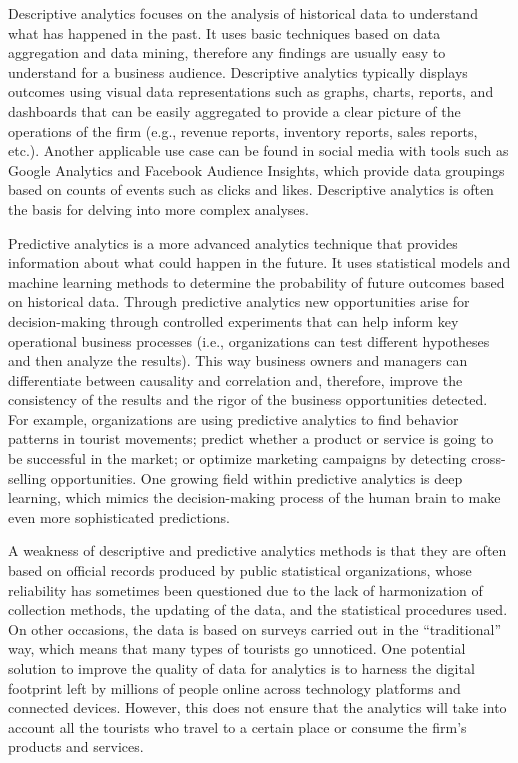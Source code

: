 \documentclass[
  letterpaper,
  DIV=11,
  numbers=noendperiod]{scrreprt}
\begin{document}
Descriptive analytics focuses on the analysis of historical data to
understand what has happened in the past. It uses basic techniques based
on data aggregation and data mining, therefore any findings are usually
easy to understand for a business audience. Descriptive analytics
typically displays outcomes using visual data representations such as
graphs, charts, reports, and dashboards that can be easily aggregated to
provide a clear picture of the operations of the firm (e.g., revenue
reports, inventory reports, sales reports, etc.). Another applicable use
case can be found in social media with tools such as Google Analytics
and Facebook Audience Insights, which provide data groupings based on
counts of events such as clicks and likes. Descriptive analytics is
often the basis for delving into more complex analyses.

Predictive analytics is a more advanced analytics technique that
provides information about what could happen in the future. It uses
statistical models and machine learning methods to determine the
probability of future outcomes based on historical data. Through
predictive analytics new opportunities arise for decision-making through
controlled experiments that can help inform key operational business
processes (i.e., organizations can test different hypotheses and then
analyze the results). This way business owners and managers can
differentiate between causality and correlation and, therefore, improve
the consistency of the results and the rigor of the business
opportunities detected. For example, organizations are using predictive
analytics to find behavior patterns in tourist movements; predict
whether a product or service is going to be successful in the market; or
optimize marketing campaigns by detecting cross-selling opportunities.
One growing field within predictive analytics is deep learning, which
mimics the decision-making process of the human brain to make even more
sophisticated predictions.

A weakness of descriptive and predictive analytics methods is that they
are often based on official records produced by public statistical
organizations, whose reliability has sometimes been questioned due to
the lack of harmonization of collection methods, the updating of the
data, and the statistical procedures used. On other occasions, the data
is based on surveys carried out in the ``traditional'' way, which means
that many types of tourists go unnoticed. One potential solution to
improve the quality of data for analytics is to harness the digital
footprint left by millions of people online across technology platforms
and connected devices. However, this does not ensure that the analytics
will take into account all the tourists who travel to a certain place or
consume the firm's products and services.
\end{document}
